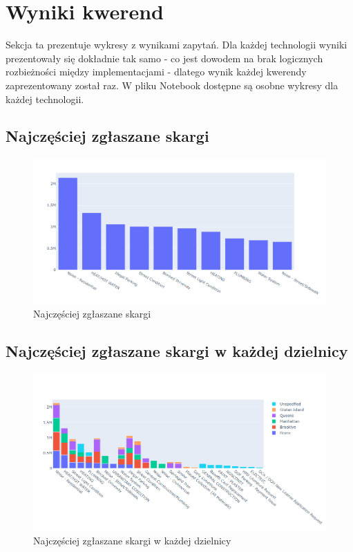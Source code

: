 \documentclass{classrep}
\begin{document}
\section{Wyniki kwerend}
Sekcja ta prezentuje wykresy z wynikami zapytań. Dla każdej technologii wyniki prezentowały się dokładnie tak samo - co jest dowodem na brak logicznych rozbieżności między implementacjami - dlatego wynik każdej kwerendy zaprezentowany został raz. W pliku Notebook dostępne są osobne wykresy dla każdej technologii.

\subsection{Najczęściej zgłaszane skargi}

\begin{figure}[H]
    \centering
    \includegraphics[width=1\textwidth]{images/images1/pandas_complaint.png}
    \caption{Najczęściej zgłaszane skargi}
    \label{q1}
\end{figure}

\subsection{Najczęściej zgłaszane skargi w każdej dzielnicy}

\begin{figure}[H]
    \centering
    \includegraphics[width=1\textwidth]{images/images1/pandas_borough.png}
    \caption{Najczęściej zgłaszane skargi w każdej dzielnicy}
    \label{q2}
\end{figure}
\end{document}

